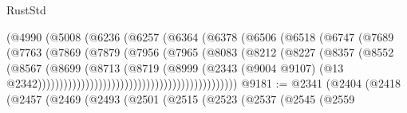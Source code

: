 \begin{lexlean}{RustStd}
\begin{coremodule}
                                          (@4990
                                            (@5008
                                              (@6236
                                                (@6257
                                                  (@6364
                                                    (@6378
                                                      (@6506
                                                        (@6518
                                                          (@6747
                                                            (@7689
                                                              (@7763
                                                                (@7869
                                                                  (@7879
                                                                    (@7956
                                                                      (@7965
                                                                        (@8083
                                                                          (@8212
                                                                            (@8227
                                                                              (@8357
                                                                                (@8552
                                                                                  (@8567
                                                                                    (@8699
                                                                                      (@8713
                                                                                        (@8719
                                                                                          (@8999
                                                                                            (@2343
                                                                                              (@9004
                                                                                                @9107)
                                                                                              (@13
                                                                                                @2342))))))))))))))))))))))))))))))))))))))))))))))
@9181 := @2341
    (@2404
      (@2418
        (@2457
          (@2469
            (@2493
              (@2501
                (@2515
                  (@2523
                    (@2537
                      (@2545
                        (@2559

\end{coremodule}
\end{lexlean}
